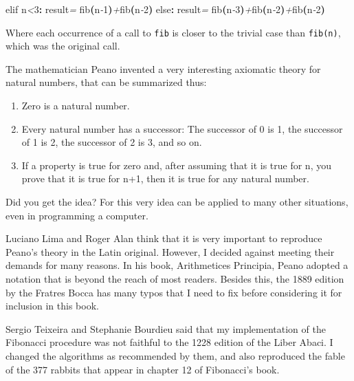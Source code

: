 \documentclass[
  12pt,
]{book}
\newenvironment{Shaded}{}{}
\newcommand{\CommentTok}[1]{\textcolor[rgb]{0.38,0.63,0.69}{\textit{#1}}}
\newcommand{\DataTypeTok}[1]{\textcolor[rgb]{0.56,0.13,0.00}{#1}}
\newcommand{\DecValTok}[1]{\textcolor[rgb]{0.25,0.63,0.44}{#1}}
\newcommand{\KeywordTok}[1]{\textcolor[rgb]{0.00,0.44,0.13}{\textbf{#1}}}
\newcommand{\NormalTok}[1]{#1}
\newcommand{\OtherTok}[1]{\textcolor[rgb]{0.00,0.44,0.13}{#1}}
\providecommand{\tightlist}{%
  \setlength{\itemsep}{0pt}\setlength{\parskip}{0pt}}
\begin{document}
\begin{Shaded}
\begin{Highlighting}[]
\DataTypeTok{elif}\NormalTok{ n}\CommentTok{\textless{}}\DecValTok{3}\KeywordTok{:} \OtherTok{result}\CommentTok{=} \DataTypeTok{fib}\KeywordTok{(}\NormalTok{n}\CommentTok{{-}}\DecValTok{1}\KeywordTok{)}\CommentTok{+}\DataTypeTok{fib}\KeywordTok{(}\NormalTok{n}\CommentTok{{-}}\DecValTok{2}\KeywordTok{)}
\DataTypeTok{else}\KeywordTok{:} \OtherTok{result}\CommentTok{=} \DataTypeTok{fib}\KeywordTok{(}\NormalTok{n}\CommentTok{{-}}\DecValTok{3}\KeywordTok{)}\CommentTok{+}\DataTypeTok{fib}\KeywordTok{(}\NormalTok{n}\CommentTok{{-}}\DecValTok{2}\KeywordTok{)}\CommentTok{+}\DataTypeTok{fib}\KeywordTok{(}\NormalTok{n}\CommentTok{{-}}\DecValTok{2}\KeywordTok{)}
\end{Highlighting}
\end{Shaded}

Where each occurrence of a call to \texttt{fib} is closer to the trivial
case than \texttt{fib(n)}, which was the original call.

The mathematician Peano invented a very interesting axiomatic theory for
natural numbers, that can be summarized thus:

\begin{enumerate}
\def\labelenumi{\arabic{enumi}.}
\tightlist
\item
  Zero is a natural number.
\item
  Every natural number has a successor: The successor of 0 is 1, the
  successor of 1 is 2, the successor of 2 is 3, and so on.
\item
  If a property is true for zero and, after assuming that it is true for
  n, you prove that it is true for n+1, then it is true for any natural
  number.
\end{enumerate}

Did you get the idea? For this very idea can be applied to many other
situations, even in programming a computer.

Luciano Lima and Roger Alan think that it is very important to reproduce
Peano's theory in the Latin original. However, I decided against meeting
their demands for many reasons. In his book, Arithmetices Principia,
Peano adopted a notation that is beyond the reach of most readers.
Besides this, the 1889 edition by the Fratres Bocca has many typos that
I need to fix before considering it for inclusion in this book.

Sergio Teixeira and Stephanie Bourdieu said that my implementation of
the Fibonacci procedure was not faithful to the 1228 edition of the
Liber Abaci. I changed the algorithms as recommended by them, and also
reproduced the fable of the 377 rabbits that appear in chapter 12 of
Fibonacci's book.
\end{document}
